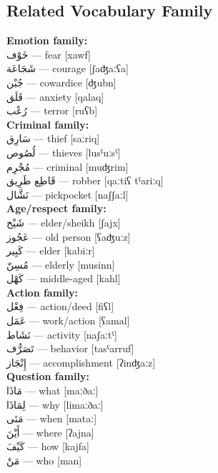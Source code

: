 \documentclass[letterpaper,12pt]{article}
\begin{document}
\subsection{Related Vocabulary Family}
\begin{multicols}{2}

\textbf{Emotion family:}\\
\textarabic{خَوْف} — fear [xawf]\\
\textarabic{شَجَاعَة} — courage [ʃaʤaːʕa]\\
\textarabic{جُبْن} — cowardice [ʤubn]\\
\textarabic{قَلَق} — anxiety [qalaq]\\
\textarabic{رُعْب} — terror [ruʕb]\\

\textbf{Criminal family:}\\
\textarabic{سَارِق} — thief [saːriq]\\
\textarabic{لُصُوص} — thieves [lusˤuːsˤ]\\
\textarabic{مُجْرِم} — criminal [muʤrim]\\
\textarabic{قَاطِع طَرِيق} — robber [qaːtiʕ tˤariːq]\\
\textarabic{نَشَّال} — pickpocket [naʃʃaːl]\\

\textbf{Age/respect family:}\\
\textarabic{شَيْخ} — elder/sheikh [ʃajx]\\
\textarabic{عَجُوز} — old person [ʕaʤuːz]\\
\textarabic{كَبِير} — elder [kabiːr]\\
\textarabic{مُسِنّ} — elderly [musinn]\\
\textarabic{كَهْل} — middle-aged [kahl]\\

\textbf{Action family:}\\
\textarabic{فِعْل} — action/deed [fiʕl]\\
\textarabic{عَمَل} — work/action [ʕamal]\\
\textarabic{نَشَاط} — activity [naʃaːtˤ]\\
\textarabic{تَصَرُّف} — behavior [tasˤarruf]\\
\textarabic{إِنْجَاز} — accomplishment [ʔinʤaːz]\\

\textbf{Question family:}\\
\textarabic{مَاذَا} — what [maːðaː]\\
\textarabic{لِمَاذَا} — why [limaːðaː]\\
\textarabic{مَتَى} — when [mataː]\\
\textarabic{أَيْنَ} — where [ʔajna]\\
\textarabic{كَيْفَ} — how [kajfa]\\
\textarabic{مَنْ} — who [man]\\
\end{multicols}
\end{document}
